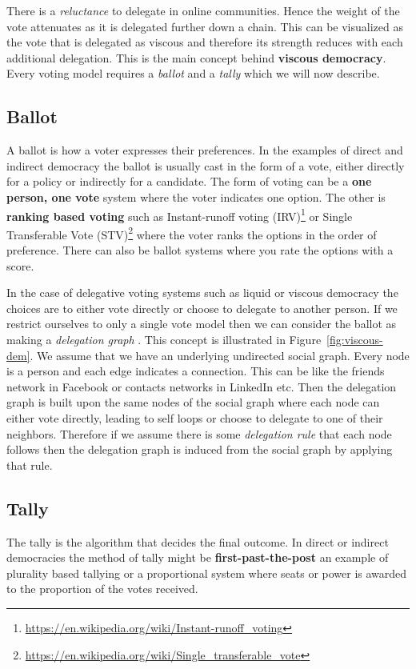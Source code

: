 There is a \textit{reluctance} to delegate in online communities. Hence the weight of the vote attenuates as it is delegated further down a chain. This can be visualized as the vote that is delegated as viscous and therefore its strength reduces with each additional delegation. This is the main concept behind \textbf{viscous democracy}. Every voting model requires a \emph{ballot} and a \emph{tally} which we will now describe.

\subsection{Ballot}
A ballot is how a voter expresses their preferences. In the examples of direct and indirect democracy the ballot is usually cast in the form of a vote, either directly for a policy or indirectly for a candidate. The form of voting can be a \textbf{one person, one vote} system where the voter indicates one option. The other is \textbf{ranking based voting} such as Instant-runoff voting (IRV)\footnote{\url{https://en.wikipedia.org/wiki/Instant-runoff_voting}} or Single Transferable Vote (STV)\footnote{\url{https://en.wikipedia.org/wiki/Single_transferable_vote}} where the voter ranks the options in the order of preference. There can also be ballot systems where you rate the options with a score.
\smallskip

In the case of delegative voting systems such as liquid or viscous democracy the choices are to either vote directly or choose to delegate to another person. If we restrict ourselves to only a single vote model then we can consider the ballot as making a \textit{delegation graph} \cite{ViscousDemocracy}. This concept is illustrated in Figure~\ref{fig:viscous-dem}. We assume that we have an underlying undirected social graph. Every node is a person and each edge indicates a connection. This can be like the friends network in Facebook or contacts networks in LinkedIn etc. Then the delegation graph is built upon the same nodes of the social graph where each node can either vote directly, leading to self loops or choose to delegate to one of their neighbors. Therefore if we assume there is some \textit{delegation rule} that each node follows then the delegation graph is induced from the social graph by applying that rule. 

\subsection{Tally}
The tally is the algorithm that decides the final outcome. In direct or indirect democracies the method of tally might be \textbf{first-past-the-post} an example of plurality based tallying or a proportional system where seats or power is awarded to the proportion of the votes received. 
\smallskip
 
